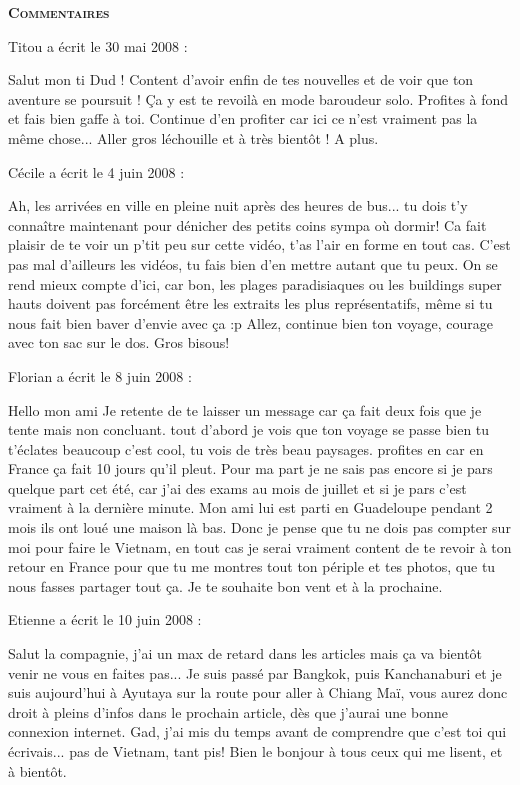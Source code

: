\bigskip
\textbf{\textsc{Commentaires}}

\medskip
Titou a écrit le 30 mai 2008 :
\begin{displayquote}
Salut mon ti Dud !
Content d'avoir enfin de tes nouvelles et de voir que ton aventure se poursuit ! Ça y est te revoilà en mode baroudeur solo. Profites à fond et fais bien gaffe à toi.
Continue d'en profiter car ici ce n'est vraiment pas la même chose...
Aller gros léchouille et à très bientôt !
A plus.
\end{displayquote}

\medskip
Cécile a écrit le 4 juin 2008 :
\begin{displayquote}
Ah, les arrivées en ville en pleine nuit après des heures de bus... tu dois t'y connaître maintenant pour dénicher des petits coins sympa où dormir!
Ca fait plaisir de te voir un p'tit peu sur cette vidéo, t'as l'air en forme en tout cas. C'est pas mal d'ailleurs les vidéos, tu fais bien d'en mettre autant que tu peux. On se rend mieux compte d'ici, car bon, les plages paradisiaques ou les buildings super hauts doivent pas forcément être les extraits les plus représentatifs, même si tu nous fait bien baver d'envie avec ça :p
Allez, continue bien ton voyage, courage avec ton sac sur le dos.
Gros bisous!
\end{displayquote}

\medskip
Florian a écrit le 8 juin 2008 :
\begin{displayquote}
Hello mon ami
Je retente de te laisser un message car ça fait deux fois que je tente mais non concluant. tout d'abord je vois que ton voyage se passe bien tu t'éclates beaucoup c'est cool, tu vois de très beau paysages. profites en car en France ça fait 10 jours qu'il pleut.
Pour ma part je ne sais pas encore si je pars quelque part cet été, car j'ai des exams au mois de juillet et si je pars c'est vraiment à la dernière minute.
Mon ami lui est parti en Guadeloupe pendant 2 mois ils ont loué une maison là bas.
Donc je pense que tu ne dois pas compter sur moi pour faire le Vietnam, en tout cas je serai vraiment content de te revoir à ton retour en France pour que tu me montres tout ton périple et tes photos, que tu nous fasses partager tout ça.
Je te souhaite bon vent et à la prochaine.
\end{displayquote}

\medskip
Etienne a écrit le 10 juin 2008 :
\begin{displayquote}
Salut la compagnie, j'ai un max de retard dans les articles mais ça va bientôt venir ne vous en faites pas...
Je suis passé par Bangkok, puis Kanchanaburi et je suis aujourd'hui à Ayutaya sur la route pour aller à Chiang Maï, vous aurez donc droit à pleins d'infos dans le prochain article, dès que j'aurai une bonne connexion internet.
Gad, j'ai mis du temps avant de comprendre que c'est toi qui écrivais... pas de Vietnam, tant pis!
Bien le bonjour à tous ceux qui me lisent, et à bientôt.
\end{displayquote}

